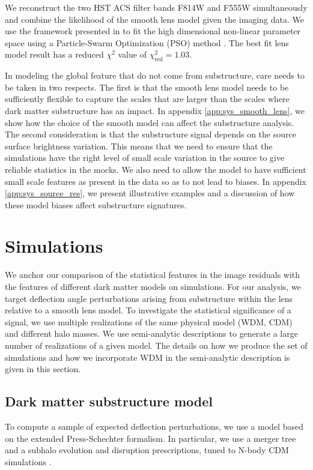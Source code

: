 \documentclass[a4paper,11pt]{article}
\begin{document}
We reconstruct the two HST ACS filter bands F814W and F555W simultaneously and combine the likelihood of the smooth lens model given the imaging data. We use the framework presented in \cite{Birrer:2015p11550} to fit the high dimensional non-linear parameter space using a Particle-Swarm Optimization (PSO) method \cite{Kennedy:2001p8447}. The best fit lens model result has a reduced $\chi^2$ value of $\chi^2_{\text{red}} = 1.03$. 

In modeling the global feature that do not come from substructure, care needs to be taken in two respects. The first is that the smooth lens model needs to be sufficiently flexible to capture the scales that are larger than the scales where dark matter substructure has an impact. In appendix \ref{app:sys_smooth_lens}, we show how the choice of the smooth model can affect the substructure analysis. The second consideration is that the substructure signal depends on the source surface brightness variation. This means that we need to ensure that the simulations have the right level of small scale variation in the source to give reliable statistics in the mocks. We also need to allow the model to have sufficient small scale features as present in the data so as to not lead to biases. In appendix \ref{app:sys_source_res}, we present illustrative examples and a discussion of how these model biases affect substructure signatures.

\section{Simulations}\label{sec:simulations}

We anchor our comparison of the statistical features in the image residuals with the features of different dark matter models on simulations. For our analysis, we target deflection angle perturbations arising from substructure within the lens relative to a smooth lens model. To investigate the statistical significance of a signal, we use multiple realizations of the same physical model (WDM, CDM) and different halo masses. We use semi-analytic descriptions to generate a large number of realizations of a given model. The details on how we produce the set of simulations and how we incorporate WDM in the semi-analytic description is given in this section.

\subsection{Dark matter substructure model} \label{sec:wdm_simulations}
To compute a sample of expected deflection perturbations, we use a model based on the extended Press-Schechter \cite{Press:1974p410, Bond:1991p341} formalism. In particular, we use a merger tree and a subhalo evolution and disruption prescriptions, tuned to N-body CDM simulations \citep[see e.g.][]{Lacey:1993p337, Parkinson:2008p31, Neistein:2008p15323, Tweed:2009p15335, Benson:2016p15322}.
\end{document}
